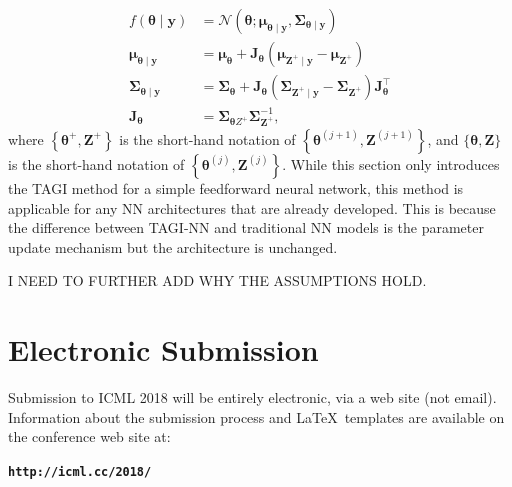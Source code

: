 \documentclass{article}
\begin{document}
%
\begin{equation*}
\begin{aligned}
f(\boldsymbol{\theta} \mid \boldsymbol{y}) &=\mathcal{N}\left(\boldsymbol{\theta} ; \boldsymbol{\mu}_{\boldsymbol{\theta} \mid \boldsymbol{y}}, \boldsymbol{\Sigma}_{\boldsymbol{\theta} \mid \boldsymbol{y}}\right) \\
\boldsymbol{\mu}_{\boldsymbol{\theta} \mid \boldsymbol{y}} &=\boldsymbol{\mu}_{\boldsymbol{\theta}}+\mathbf{J}_{\boldsymbol{\theta}}\left(\boldsymbol{\mu}_{\boldsymbol{Z}^{+} \mid \boldsymbol{y}}-\boldsymbol{\mu}_{\boldsymbol{Z}^{+}}\right) \\
\boldsymbol{\Sigma}_{\boldsymbol{\theta} \mid \boldsymbol{y}} &=\boldsymbol{\Sigma}_{\boldsymbol{\theta}}+\mathbf{J}_{\boldsymbol{\theta}}\left(\boldsymbol{\Sigma}_{\boldsymbol{Z}^{+} \mid \boldsymbol{y}}-\boldsymbol{\Sigma}_{\boldsymbol{Z}^{+}}\right) \mathbf{J}_{\boldsymbol{\theta}}^{\top} \\
\mathbf{J}_{\boldsymbol{\theta}} &=\boldsymbol{\Sigma}_{\boldsymbol{\theta} Z^{+}} \boldsymbol{\Sigma}_{\boldsymbol{Z}^{+}}^{-1},
\end{aligned}
\end{equation*}
where $\left\{\boldsymbol{\theta}^{+}, \boldsymbol{Z}^{+}\right\}$ is the short-hand notation of $\left\{\boldsymbol{\theta}^{(j+1)}, \boldsymbol{Z}^{(j+1)}\right\}$, and $\{\boldsymbol{\theta}, \boldsymbol{Z}\}$ is the short-hand notation of  $\left\{\boldsymbol{\theta}^{(j)}, \boldsymbol{Z}^{(j)}\right\}$.
While this section only introduces the TAGI method for a simple feedforward neural network, this method is applicable for any NN architectures that are already developed. This is because the difference between TAGI-NN and traditional NN models is the parameter update mechanism but the architecture is unchanged.

I NEED TO FURTHER ADD WHY THE ASSUMPTIONS HOLD.

\section{Electronic Submission}
\label{submission}

Submission to ICML 2018 will be entirely electronic, via a web site
(not email). Information about the submission process and \LaTeX\ templates
are available on the conference web site at:
\begin{center}
\textbf{\texttt{http://icml.cc/2018/}}
\end{center}
\end{document}

